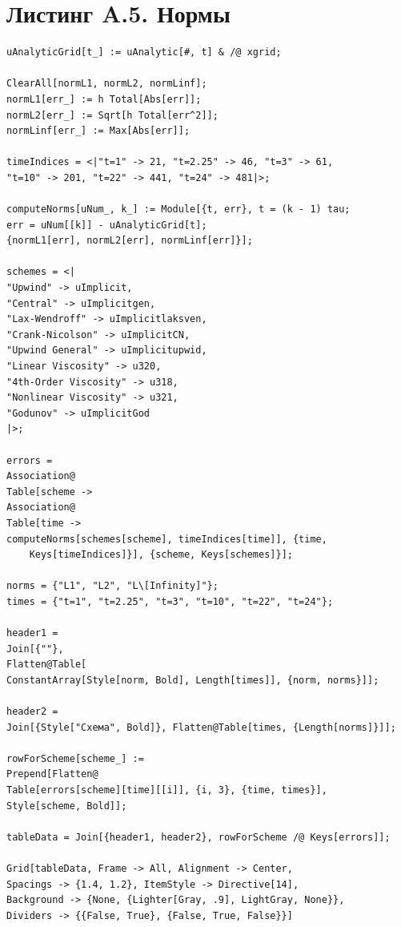 \documentclass[a4paper,14pt]{extreport}
\begin{document}
\section*{Листинг A.5. Нормы}
\begin{lstlisting}
uAnalyticGrid[t_] := uAnalytic[#, t] & /@ xgrid;

ClearAll[normL1, normL2, normLinf];
normL1[err_] := h Total[Abs[err]];
normL2[err_] := Sqrt[h Total[err^2]];
normLinf[err_] := Max[Abs[err]];

timeIndices = <|"t=1" -> 21, "t=2.25" -> 46, "t=3" -> 61, 
"t=10" -> 201, "t=22" -> 441, "t=24" -> 481|>;

computeNorms[uNum_, k_] := Module[{t, err}, t = (k - 1) tau;
err = uNum[[k]] - uAnalyticGrid[t];
{normL1[err], normL2[err], normLinf[err]}];

schemes = <|
"Upwind" -> uImplicit, 
"Central" -> uImplicitgen, 
"Lax-Wendroff" -> uImplicitlaksven, 
"Crank-Nicolson" -> uImplicitCN, 
"Upwind General" -> uImplicitupwid, 
"Linear Viscosity" -> u320, 
"4th-Order Viscosity" -> u318, 
"Nonlinear Viscosity" -> u321, 
"Godunov" -> uImplicitGod
|>;

errors = 
Association@
Table[scheme -> 
Association@
Table[time -> 
computeNorms[schemes[scheme], timeIndices[time]], {time, 
	Keys[timeIndices]}], {scheme, Keys[schemes]}];

norms = {"L1", "L2", "L\[Infinity]"};
times = {"t=1", "t=2.25", "t=3", "t=10", "t=22", "t=24"};

header1 = 
Join[{""}, 
Flatten@Table[
ConstantArray[Style[norm, Bold], Length[times]], {norm, norms}]];

header2 = 
Join[{Style["Схема", Bold]}, Flatten@Table[times, {Length[norms]}]];

rowForScheme[scheme_] := 
Prepend[Flatten@
Table[errors[scheme][time][[i]], {i, 3}, {time, times}], 
Style[scheme, Bold]];

tableData = Join[{header1, header2}, rowForScheme /@ Keys[errors]];

Grid[tableData, Frame -> All, Alignment -> Center, 
Spacings -> {1.4, 1.2}, ItemStyle -> Directive[14], 
Background -> {None, {Lighter[Gray, .9], LightGray, None}}, 
Dividers -> {{False, True}, {False, True, False}}]
\end{lstlisting}
\end{document}
